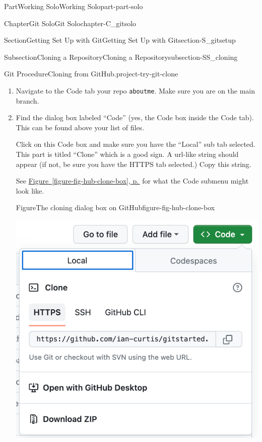 \documentclass[twoside,10pt,]{book}
\newcommand{\xreffont}{\relax}
\newcommand{\mono}[1]{\texttt{#1}}
\begin{document}
\begin{partptx}{Part}{Working Solo}{}{Working Solo}{}{}{part-part-solo}
\begin{chapterptx}{Chapter}{Git Solo}{}{Git Solo}{}{}{chapter-C_gitsolo}
\begin{sectionptx}{Section}{Getting Set Up with Git}{}{Getting Set Up with Git}{}{}{section-S_gitsetup}
\begin{subsectionptx}{Subsection}{Cloning a Repository}{}{Cloning a Repository}{}{}{subsection-SS_cloning}
\begin{project}{Git Procedure}{Cloning from GitHub.}{project-try-git-clone}
\begin{enumerate}[font=\bfseries,label=(\alph*),ref=\alph*]%
\item{}Navigate to the Code tab your repo \mono{aboutme}. Make sure you are on the main branch.%
\item\label{task-clone-https}Find the dialog box labeled ``Code'' (yes, the Code box inside the Code tab). This can be found above your list of files.%
\par
Click on this Code box and make sure you have the ``Local'' sub tab selected. This part is titled ``Clone'' which is a good sign. A url-like string should appear (if not, be sure you have the HTTPS tab selected.) Copy this string.%
\par
See \hyperref[figure-fig-hub-clone-box]{Figure~{\xreffont\ref{figure-fig-hub-clone-box}}, p.\,\pageref{figure-fig-hub-clone-box}} for what the Code submenu might look like.%
\begin{figureptx}{Figure}{The cloning dialog box on GitHub}{figure-fig-hub-clone-box}{}%
\begin{image}{0.2}{0.6}{0.2}{}%
\includegraphics[width=\linewidth]{external/hub_clone_box.pdf}
\end{image}%
\tcblower
\end{figureptx}%

\end{enumerate}
\end{project}
\end{subsectionptx}
\end{sectionptx}
\end{chapterptx}
\end{partptx}
\end{document}
